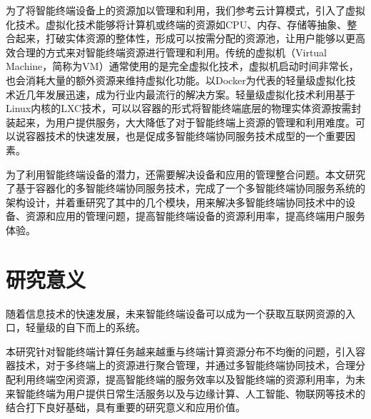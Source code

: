 为了将智能终端设备上的资源加以管理和利用，我们参考云计算模式，引入了虚拟化技术。虚拟化技术能够将计算机或终端的资源如CPU、内存、存储等抽象、整合起来，打破实体资源的整体性，形成可以按需分配的资源池，让用户能够以更高效合理的方式来对智能终端资源进行管理和利用。传统的虚拟机（Virtual Machine，简称为VM）通常使用的是完全虚拟化技术，虚拟机启动时间非常长，也会消耗大量的额外资源来维持虚拟化功能。以Docker为代表的轻量级虚拟化技术近几年发展迅速，成为行业内最流行的解决方案。轻量级虚拟化技术利用基于Linux内核的LXC技术，可以以容器的形式将智能终端底层的物理实体资源按需封装起来，为用户提供服务，大大降低了对于智能终端上资源的管理和利用难度。可以说容器技术的快速发展，也是促成多智能终端协同服务技术成型的一个重要因素。

为了利用智能终端设备的潜力，还需要解决设备和应用的管理整合问题\citep{morabito2017evaluating}。本文研究了基于容器化的多智能终端协同服务技术，完成了一个多智能终端协同服务系统的架构设计，并着重研究了其中的几个模块，用来解决多智能终端协同技术中的设备、资源和应用的管理问题，提高智能终端设备的资源利用率，提高终端用户服务体验。



\section{研究意义}

随着信息技术的快速发展，未来智能终端设备可以成为一个获取互联网资源的入口，轻量级的自下而上的系统。

本研究针对智能终端计算任务越来越重与终端计算资源分布不均衡的问题，引入容器技术，对于多终端上的资源进行聚合管理，并通过多智能终端协同技术，合理分配利用终端空闲资源，提高智能终端的服务效率以及智能终端的资源利用率，为未来智能终端为用户提供日常生活服务以及与边缘计算、人工智能、物联网等技术的结合打下良好基础，具有重要的研究意义和应用价值。



